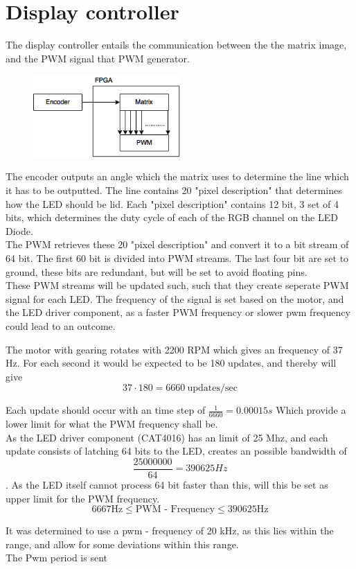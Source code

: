 \section{Display controller}
The display controller entails the communication between the the matrix image, and the PWM signal that PWM generator. 


\begin{figure}[H]
	\center
	\includegraphics[width = 0.5\textwidth]{images/Image_controller_setup.png}
	\caption{}
	\label{fig:Image_controller_setup}
\end{figure}

The encoder outputs an angle which the matrix uses to determine the line which it has to be outputted.  The line contains 20 "pixel description" that determines how the LED should be lid.  Each "pixel description" contains 12 bit, 3 set of 4 bits, which determines the duty cycle of each of the RGB channel on the LED Diode.  \\

The PWM retrieves these 20 "pixel description" and convert it to a bit stream of 64 bit.  
The first 60 bit is divided into PWM streams. The last four bit are set to ground,  these bits are redundant, but will be set to avoid floating pins. \\

These PWM streams will be updated such, such that they create seperate PWM signal for each LED.  The frequency of the signal is set based on the motor, and the LED driver component, as a faster PWM frequency or slower pwm frequency could lead to an outcome. 

The motor with gearing rotates with 2200 RPM which gives an frequency of 37 Hz.	
For each second it would be expected to be 180 updates, and thereby will give 
$$37 \cdot 180 = 6660 ~\text{updates/sec}$$

Each update should occur with an time step of $\frac{1}{6660} = 0.00015s$ Which provide a lower limit for what the PWM frequency shall be.  \\

As the LED driver component (CAT4016) has an limit of 25 Mhz, and each update consists of latching  64 bits to the LED,  creates an possible bandwidth of $$\frac{25000000}{64} =  390625 Hz$$. As the LED itself cannot process 64 bit faster than this, will this be set as upper limit for the PWM frequency.    
$$6667 \text{Hz}  \leq \text{PWM - Frequency}  \leq 390625 \text{Hz}  $$

It was determined to use a pwm - frequency of 20 kHz, as this lies within the range, and allow for some deviations within this range.  \\

The Pwm period is sent 




